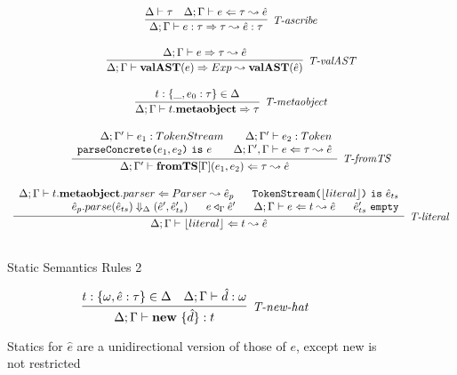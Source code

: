 \begin{figure}
\[\begin{array}{c}
\infer[\textit{T-ascribe}]
	{\Delta; \Gamma  \vdash  e:\tau \Rightarrow \tau \leadsto \hat{e}:\tau}
	{\Delta \vdash \tau & \Delta; \Gamma \vdash e \Leftarrow \tau \leadsto \hat{e} } \\[3ex]

\infer[\textit{T-valAST}]
        {\Delta; \Gamma \vdash \keyw{valAST}(e) \Rightarrow Exp \leadsto \keyw{valAST}(\hat{e}) }
	{\Delta; \Gamma \vdash e \Rightarrow \tau \leadsto \hat{e}} \\[3ex]

\infer[\textit{T-metaobject}]
        {\Delta; \Gamma \vdash t.\keyw{metaobject} \Rightarrow \tau   }
	{t:\{\_, e_0:\tau\} \in \Delta} \\[3ex]


\infer[\textit{T-fromTS}]
	  {\Delta; \Gamma' \vdash \keyw{fromTS}[\Gamma](e_1,e_2) \Leftarrow \tau \leadsto \hat{e} }
	  {\renewcommand{\arraystretch}{1}
	    \begin{array}{r}
	    \Delta;\Gamma' \vdash e_1:TokenStream ~~~~~~ \Delta;\Gamma' \vdash e_2:Token\\
            \texttt{parseConcrete(}e_1,e_2\texttt{)}\ \texttt{is}\ e ~~~~~~\Delta; \Gamma', \Gamma \vdash e \Leftarrow \tau \leadsto \hat{e}
            \end{array}
       } \\[3ex]  

\infer[\textit{T-literal}]
	  {\Delta; \Gamma \vdash \lfloor literal \rfloor \Leftarrow t \leadsto \hat{e} }
	  {\renewcommand{\arraystretch}{1}
	    \begin{array}{r}
	    \Delta;\Gamma \vdash t.\keyw{metaobject}.parser\Leftarrow Parser \leadsto \hat{e}_p ~~~~~ \texttt{TokenStream(}\lfloor literal \rfloor \texttt{)}\ \texttt{is}\ \hat{e}_{ts}\\
            \hat{e}_p.parse(\hat{e}_{ts}) \Downarrow_{\Delta} (\hat{e}', \hat e_{ts}') ~~~~~  e \triangleleft_\Gamma \hat{e}'~~~~~ \Delta;\Gamma\vdash e\Leftarrow t \leadsto \hat{e} ~~~~~ \hat e_{ts}'\ \texttt{empty}
            \end{array}
       } \\[3ex]   
\end{array}
\]
\label{fig:statics2}
\caption{Static Semantics Rules 2}
\end{figure}

\begin{figure}
\centering
\[
\infer[\textit{T-new-hat}]
	{\Delta; \Gamma \vdash \keyw{new}\ \{ \hat d \} :  t }
	{ t:\{\omega, \hat e:\tau\} \in \Delta & \Delta;\Gamma \vdash \hat d : \omega}
\]
\caption{Statics for $\hat e$ are a unidirectional version of those of $e$, except new is not restricted}
\label{fig:staticsHat}
\end{figure}

